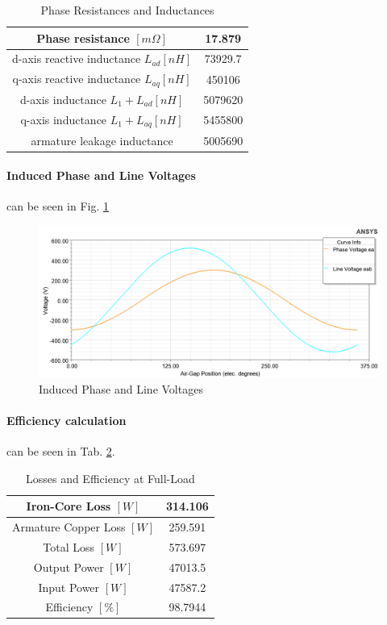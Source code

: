 \documentclass [a4 paper, 11pt, titlepage] {article}
\begin{document}
	\begin{table}[h]
		\begin{center}
			\begin{tabular}{c|c}
				Phase resistance $[m\Omega]$ & 17.879 \\
				\hline\hline
				d-axis reactive inductance $L_{ad} [nH]$ & 73929.7 \\
				\hline
				q-axis reactive inductance $L_{aq} [nH]$ & 450106 \\
				\hline
				d-axis inductance $L_1+L_{ad} [nH]$ & 5079620 \\
				\hline
				q-axis inductance $L_1+L_{aq} [nH]$ & 5455800 \\
				\hline
				armature leakage inductance & 5005690 \\
			\end{tabular}
		\end{center}
		\caption{Phase Resistances and Inductances}
		\label{tab:phRandL}
	\end{table}
	
	\paragraph{Induced Phase and Line Voltages} can be seen in Fig. \ref{fig:inducedPhL2lV}
	\begin{figure}[h]
		\includegraphics[width=\textwidth]{inducedVoltages.png}
		\caption{Induced Phase and Line Voltages}
		\label{fig:inducedPhL2lV}
	\end{figure}
	
	
	\paragraph{Efficiency calculation} can be seen in Tab. \ref{tab:effCalc}. 
	\begin{table}[h]
		\begin{center}
			\begin{tabular}{c|c}
				Iron-Core Loss $[W]$ & 314.106 \\
				\hline
				Armature Copper Loss $[W]$ & 259.591 \\
				\hline
				Total Loss $[W]$ & 573.697 \\
				\hline
				Output Power $[W]$ & 47013.5 \\
				\hline
				Input Power $[W]$ & 47587.2 \\
				\hline
				Efficiency $[\%]$ & 98.7944 \\
			\end{tabular}
		\end{center}
		\caption{Losses and Efficiency at Full-Load}
		\label{tab:effCalc}
	\end{table}
	
\end{document}

